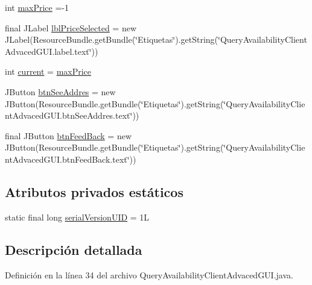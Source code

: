 \begin{DoxyCompactItemize}
\item 
int \mbox{\hyperlink{classgui_1_1_query_availability_client_advaced_g_u_i_a518ac2fa95f208a8c9cda2c90b3503d4}{max\+Price}} =-\/1
\item 
final J\+Label \mbox{\hyperlink{classgui_1_1_query_availability_client_advaced_g_u_i_a8f3d9f21b9a743c3307e3d329943df48}{lbl\+Price\+Selected}} = new J\+Label(Resource\+Bundle.\+get\+Bundle(\char`\"{}Etiquetas\char`\"{}).get\+String(\char`\"{}Query\+Availability\+Client\+Advaced\+G\+U\+I.\+label.\+text\char`\"{}))
\item 
int \mbox{\hyperlink{classgui_1_1_query_availability_client_advaced_g_u_i_a6d8d598cf63230a1751701ca290a77d7}{current}} = \mbox{\hyperlink{classgui_1_1_query_availability_client_advaced_g_u_i_a518ac2fa95f208a8c9cda2c90b3503d4}{max\+Price}}
\item 
J\+Button \mbox{\hyperlink{classgui_1_1_query_availability_client_advaced_g_u_i_ad575bbdc8ef01ae247bcecb682cd281f}{btn\+See\+Addres}} = new J\+Button(Resource\+Bundle.\+get\+Bundle(\char`\"{}Etiquetas\char`\"{}).get\+String(\char`\"{}Query\+Availability\+Client\+Advaced\+G\+U\+I.\+btn\+See\+Addres.\+text\char`\"{}))
\item 
final J\+Button \mbox{\hyperlink{classgui_1_1_query_availability_client_advaced_g_u_i_a8d6433ba8b1b6feb92be582d0caf09ec}{btn\+Feed\+Back}} = new J\+Button(Resource\+Bundle.\+get\+Bundle(\char`\"{}Etiquetas\char`\"{}).get\+String(\char`\"{}Query\+Availability\+Client\+Advaced\+G\+U\+I.\+btn\+Feed\+Back.\+text\char`\"{}))
\end{DoxyCompactItemize}
\subsection*{Atributos privados estáticos}
\begin{DoxyCompactItemize}
\item 
static final long \mbox{\hyperlink{classgui_1_1_query_availability_client_advaced_g_u_i_aea7ff513ee078310ff443f0140fdd535}{serial\+Version\+U\+ID}} = 1L
\end{DoxyCompactItemize}


\subsection{Descripción detallada}


Definición en la línea 34 del archivo Query\+Availability\+Client\+Advaced\+G\+U\+I.\+java.




